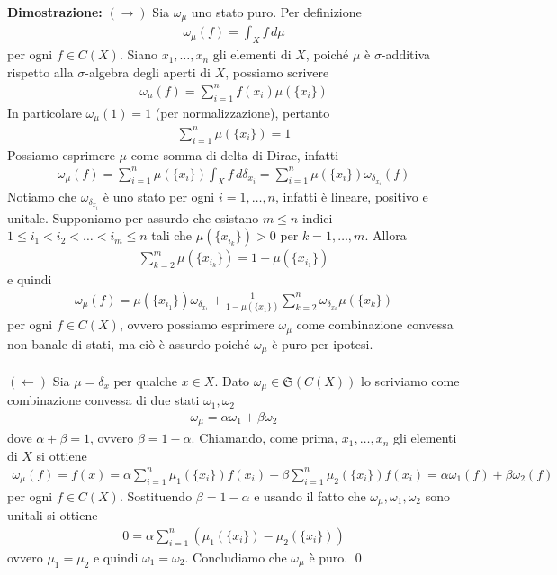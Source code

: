 \documentclass{article}
\numberwithin{equation}{subsection}
\begin{document}
\textbf{Dimostrazione:} $(\rightarrow)$ Sia $\omega_\mu$ uno stato puro. Per definizione 
\begin{align*}
    \omega_\mu(f) = \int_X f \, d\mu
\end{align*}
per ogni $f \in C(X)$. Siano $x_1, \dots, x_n$ gli elementi di $X$, poiché $\mu$ è $\sigma$-additiva rispetto alla $\sigma$-algebra degli aperti di $X$, possiamo scrivere 
\begin{align*}
    \omega_\mu(f) = \sum_{i = 1}^n f(x_i)\mu(\{x_i\})
\end{align*}
In particolare $\omega_\mu(1) = 1$ (per normalizzazione), pertanto 
\begin{align*}
    \sum_{i = 1}^n \mu(\{x_i\}) = 1
\end{align*}
Possiamo esprimere $\mu$ come somma di delta di Dirac, infatti 
\begin{align*}
    \omega_\mu(f) = \sum_{i = 1}^n \mu(\{x_i\})\int_X f \, d\delta_{x_i} = \sum_{i = 1}^n \mu(\{x_i\})\omega_{\delta_{x_i}}(f)
\end{align*}
Notiamo che $\omega_{\delta_{x_i}}$ è uno stato per ogni $i = 1, \dots, n$, infatti è lineare, positivo e unitale. Supponiamo per assurdo che esistano $m \leq n$ indici $1 \leq i_1 < i_2 < \dots < i_m \leq n$ tali che $\mu(\{x_{i_k}\}) > 0$ per $k = 1, \dots, m$. Allora 
\begin{align*}
    \sum_{k = 2}^m \mu(\{x_{i_k}\}) = 1 - \mu(\{x_{i_1}\})
\end{align*}
e quindi 
\begin{align*}
    \omega_\mu(f) = \mu(\{x_{i_1}\})\omega_{\delta_{x_1}} + \frac{1}{1 - \mu(\{x_1\})}\sum_{k = 2}^n \omega_{\delta_{x_k}}\mu(\{x_k\})
\end{align*}
per ogni $f \in C(X)$, ovvero possiamo esprimere $\omega_\mu$ come combinazione convessa non banale di stati, ma ciò è assurdo poiché $\omega_\mu$ è puro per ipotesi. \\ \\
$(\leftarrow)$ Sia $\mu = \delta_x$ per qualche $x \in X$. Dato $\omega_\mu \in \mathfrak{S}(C(X))$ lo scriviamo come combinazione convessa di due stati $\omega_1, \omega_2$
\begin{align*}
    \omega_\mu = \alpha\omega_1 + \beta\omega_2
\end{align*}
dove $\alpha + \beta = 1$, ovvero $\beta = 1 - \alpha$. Chiamando, come prima, $x_1, \dots, x_n$ gli elementi di $X$ si ottiene 
\begin{align*}
    \omega_\mu(f) = f(x) = \alpha\sum_{i = 1}^n \mu_1(\{x_i\})f(x_i) + \beta\sum_{i = 1}^n\mu_2(\{x_i\})f(x_i) = \alpha\omega_1(f) + \beta\omega_2(f)
\end{align*}
per ogni $f \in C(X)$. Sostituendo $\beta = 1 - \alpha$ e usando il fatto che $\omega_\mu, \omega_1, \omega_2$ sono unitali si ottiene
\begin{align*}
    0 = \alpha\sum_{i = 1}^n (\mu_1(\{x_i\}) - \mu_2(\{x_i\}))
\end{align*}
ovvero $\mu_1 = \mu_2$ e quindi $\omega_1 = \omega_2$. Concludiamo che $\omega_\mu$ è puro. \qed
\end{document}
